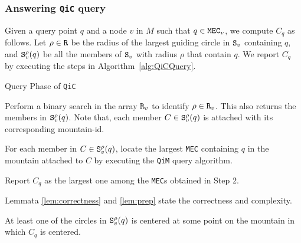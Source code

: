 \documentclass[12pt]{llncs}
\begin{document}
\vspace{-0.15in}
\subsubsection{Answering {\tt QiC} query}
Given a query point $q$ and a node $v$ in $M$ such that $q \in {\tt MEC}_v$, we 
compute 
$C_q$ as follows. Let $\rho \in {\tt R}$ be the radius of the largest guiding circle in
${\tt S}_v$ containing $q$, and ${\tt S}_v^\rho(q)$ be all the members of ${\tt S}_v$ 
with radius $\rho$ that contain $q$.  We report $C_q$ by executing the steps in Algorithm\ \ref{alg:QiCQuery}. 


\begin{algorithm}[h!]
\caption{Query Phase of {\tt QiC}}
\label{alg:QiCQuery}
\begin{algorithmic}[1]


\STATE Perform a binary search in the array ${\tt R}_v$ to identify 
$\rho \in {\tt R}_v$. This also returns the members in ${\tt S}_v^\rho(q)$. 
Note that, each member $C \in {\tt S}_v^\rho(q)$ is attached with its 
corresponding mountain-id.

\STATE For each member in $C \in {\tt S}_v^\rho(q)$, locate the largest 
{\tt MEC}  containing $q$ in the mountain attached to $C$ by executing the 
{\tt QiM} query algorithm.

\STATE Report $C_q$ as the largest one among the {\tt MEC}s obtained in
Step 2. 
\end{algorithmic}
\end{algorithm}




Lemmata \ref{lem:correctness} and  \ref{lem:prep} state the correctness and 
complexity. 

\begin{lemma}\label{lem:correctness}
At least one of the circles in ${\tt S}_v^\rho(q)$ is centered at some point 
on the mountain in which $C_q$ is centered. 
\end{lemma}
\end{document}
